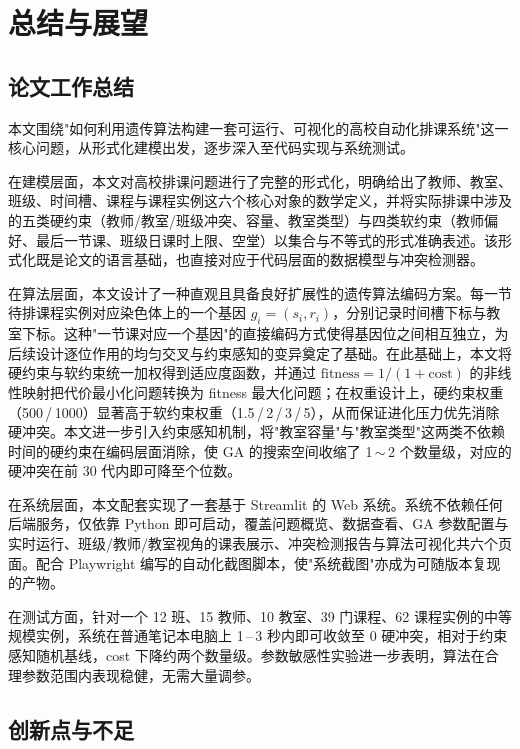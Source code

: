 \hspace*{\fill}

\section{总结与展望}

\subsection{论文工作总结}

本文围绕"如何利用遗传算法构建一套可运行、可视化的高校自动化排课系统"这一核心问题，从形式化建模出发，逐步深入至代码实现与系统测试。

在建模层面，本文对高校排课问题进行了完整的形式化，明确给出了教师、教室、班级、时间槽、课程与课程实例这六个核心对象的数学定义，并将实际排课中涉及的五类硬约束（教师/教室/班级冲突、容量、教室类型）与四类软约束（教师偏好、最后一节课、班级日课时上限、空堂）以集合与不等式的形式准确表述。该形式化既是论文的语言基础，也直接对应于代码层面的数据模型与冲突检测器。

在算法层面，本文设计了一种直观且具备良好扩展性的遗传算法编码方案。每一节待排课程实例对应染色体上的一个基因 $g_i = (s_i, r_i)$，分别记录时间槽下标与教室下标。这种"一节课对应一个基因"的直接编码方式使得基因位之间相互独立，为后续设计逐位作用的均匀交叉与约束感知的变异奠定了基础。在此基础上，本文将硬约束与软约束统一加权得到适应度函数，并通过 $\mathrm{fitness} = 1/(1 + \mathrm{cost})$ 的非线性映射把代价最小化问题转换为 fitness 最大化问题；在权重设计上，硬约束权重（500\,/\,1000）显著高于软约束权重（1.5\,/\,2\,/\,3\,/\,5），从而保证进化压力优先消除硬冲突。本文进一步引入约束感知机制，将"教室容量"与"教室类型"这两类不依赖时间的硬约束在编码层面消除，使 GA 的搜索空间收缩了 1\,$\sim$\,2 个数量级，对应的硬冲突在前 30 代内即可降至个位数。

在系统层面，本文配套实现了一套基于 Streamlit 的 Web 系统。系统不依赖任何后端服务，仅依靠 Python 即可启动，覆盖问题概览、数据查看、GA 参数配置与实时运行、班级/教师/教室视角的课表展示、冲突检测报告与算法可视化共六个页面。配合 Playwright 编写的自动化截图脚本，使"系统截图"亦成为可随版本复现的产物。

在测试方面，针对一个 12 班、15 教师、10 教室、39 门课程、62 课程实例的中等规模实例，系统在普通笔记本电脑上 1\,--\,3 秒内即可收敛至 0 硬冲突，相对于约束感知随机基线，cost 下降约两个数量级。参数敏感性实验进一步表明，算法在合理参数范围内表现稳健，无需大量调参。

\subsection{创新点与不足}

